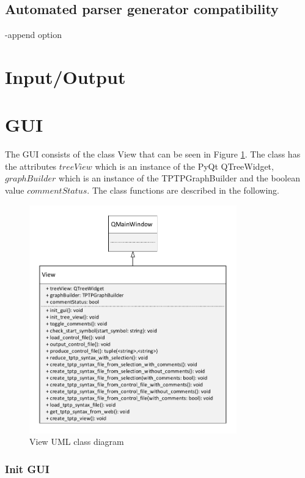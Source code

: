 \subsection{Automated parser generator compatibility}\label{sec:ImplementationAutomatedParserGenerator}
-append option

\section{Input/Output}\label{sec:ImplementationInOut}

\section{GUI}\label{sec:ImplementationGUI}
The GUI consists of the class View that can be seen in Figure \ref{fig:ImplementationViewClassDiagram}. The class has the attributes $treeView$ which is an instance of the PyQt QTreeWidget, $graphBuilder$ which is an instance of the TPTPGraphBuilder and the boolean value $commentStatus$. The class functions are described in the following.

\begin{figure}[H]
\centering
\includegraphics[width=0.8\textwidth]{images/Implementation_view_class_diagramm.pdf}
\caption{View UML class diagram}
\label{fig:ImplementationViewClassDiagram}
\end{figure}

\subsubsection{Init GUI}\label{sec:ImplementationGUIInit}

